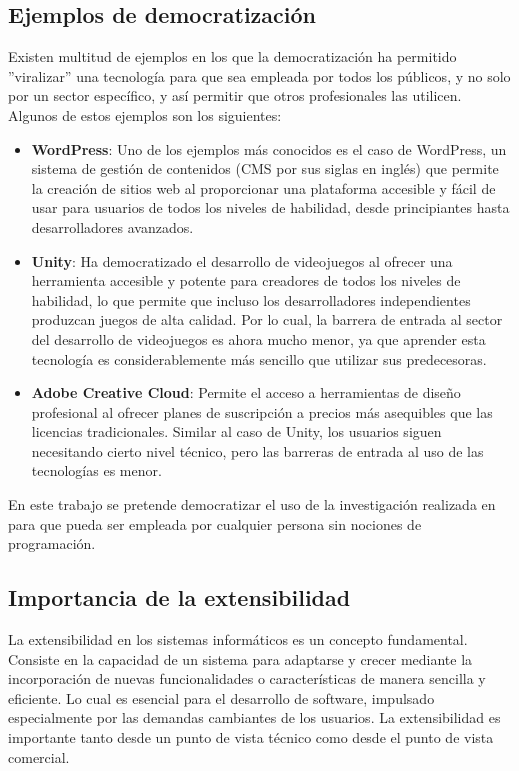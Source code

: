 \subsection{Ejemplos de democratización}

Existen multitud de ejemplos en los que la democratización ha permitido ''viralizar'' una tecnología para que sea empleada por todos los públicos, y no solo por un sector específico, y así permitir que otros profesionales las utilicen. Algunos de estos ejemplos son los siguientes: 

\begin{itemize}
	
	\item \textbf{WordPress}: Uno de los ejemplos más conocidos es el caso de WordPress, un sistema de gestión de contenidos (CMS por sus siglas en inglés) que permite la creación de sitios web al proporcionar una plataforma accesible y fácil de usar para usuarios de todos los niveles de habilidad, desde principiantes hasta desarrolladores avanzados.
	
	\item \textbf{Unity}: Ha democratizado el desarrollo de videojuegos al ofrecer una herramienta accesible y potente para creadores de todos los niveles de habilidad, lo que permite que incluso los desarrolladores independientes produzcan juegos de alta calidad. Por lo cual, la barrera de entrada al sector del desarrollo de videojuegos es ahora mucho menor, ya que aprender esta tecnología es considerablemente más sencillo que utilizar sus predecesoras.
	
	\item \textbf{Adobe Creative Cloud}: Permite el acceso a herramientas de diseño profesional al ofrecer planes de suscripción a precios más asequibles que las licencias tradicionales. Similar al caso de Unity, los usuarios siguen necesitando cierto nivel técnico, pero las barreras de entrada al uso de las tecnologías es menor.

	
\end{itemize}

En este trabajo se pretende democratizar el uso de la investigación realizada en \ga  para que pueda ser empleada por cualquier persona sin nociones de programación.

\subsection{Importancia de la extensibilidad}

La extensibilidad en los sistemas informáticos es un concepto fundamental. Consiste en la capacidad de un sistema para adaptarse y crecer mediante la incorporación de nuevas funcionalidades o características de manera sencilla y eficiente. Lo cual es esencial para el desarrollo de software, impulsado especialmente por las demandas cambiantes de los usuarios. La extensibilidad es importante tanto desde un punto de vista técnico como desde el punto de vista comercial.

